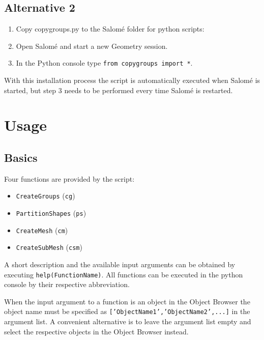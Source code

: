 \documentclass[10pt,a4paper,notitlepage]{scrartcl}
\newcommand{\scriptpath}{\path{~/sluss/anhe} }
\begin{document}
\subsection*{Alternative 2} %
\label{sub:alternative_2}
\begin{enumerate}
    \item Copy copygroups.py to the Salomé folder for python scripts: \\  \scriptpath{}
    \item Open Salomé and start a new Geometry session.
    \item In the Python console type \texttt{from copygroups import *}.
\end{enumerate}
With this installation process the script is automatically executed when Salomé is started, but step 3 needs to be performed every time Salomé is restarted.

\section{Usage} %
\label{sec:usage}
\subsection*{Basics} %
\label{sub:basics}
Four functions are provided by the script:
\begin{itemize}
	\item \texttt{CreateGroups} (\texttt{cg})
	\item \texttt{PartitionShapes} (\texttt{ps})
	\item \texttt{CreateMesh} (\texttt{cm})
	\item \texttt{CreateSubMesh} (\texttt{csm})
\end{itemize}
A short description and the available input arguments can be obtained by executing \texttt{help(FunctionName)}. All functions can be executed in the python console by their respective abbreviation.

When the input argument to a function is an object in the Object Browser the object name must be specified as \texttt{['ObjectName1','ObjectName2',...]} in the argument list. A convenient alternative is to leave the argument list empty and select the respective objects in the Object Browser instead.
\end{document}
